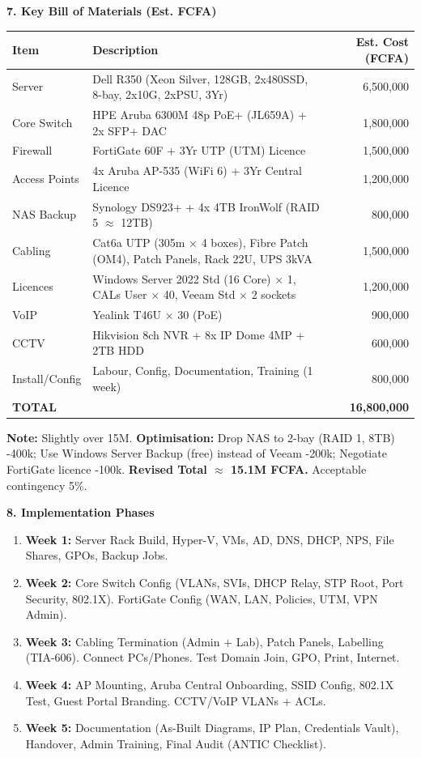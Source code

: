 \documentclass[11pt]{article}
\begin{document}
\begin{exoresolu}
\noindent\textbf{7. Key Bill of Materials (Est. FCFA)}
\begin{center}
\begin{tabularx}{\linewidth}{|l|X|r|}
\hline
\rowcolor{popblueL}
\textbf{Item} & \textbf{Description} & \textbf{Est. Cost (FCFA)} \\
\hline
Server & Dell R350 (Xeon Silver, 128GB, 2x480SSD, 8-bay, 2x10G, 2xPSU, 3Yr) & 6,500,000 \\
Core Switch & HPE Aruba 6300M 48p PoE+ (JL659A) + 2x SFP+ DAC & 1,800,000 \\
Firewall & FortiGate 60F + 3Yr UTP (UTM) Licence & 1,500,000 \\
Access Points & 4x Aruba AP-535 (WiFi 6) + 3Yr Central Licence & 1,200,000 \\
NAS Backup & Synology DS923+ + 4x 4TB IronWolf (RAID 5 $\approx$ 12TB) & 800,000 \\
Cabling & Cat6a UTP (305m $\times$ 4 boxes), Fibre Patch (OM4), Patch Panels, Rack 22U, UPS 3kVA & 1,500,000 \\
Licences & Windows Server 2022 Std (16 Core) $\times$ 1, CALs User $\times$ 40, Veeam Std $\times$ 2 sockets & 1,200,000 \\
VoIP & Yealink T46U $\times$ 30 (PoE) & 900,000 \\
CCTV & Hikvision 8ch NVR + 8x IP Dome 4MP + 2TB HDD & 600,000 \\
Install/Config & Labour, Config, Documentation, Training (1 week) & 800,000 \\
\hline
\textbf{TOTAL} & & \textbf{16,800,000} \\
\hline
\end{tabularx}
\end{center}
\textbf{Note:} Slightly over 15M. \textbf{Optimisation:} Drop NAS to 2-bay (RAID 1, 8TB) -400k; Use Windows Server Backup (free) instead of Veeam -200k; Negotiate FortiGate licence -100k. \textbf{Revised Total $\approx$ 15.1M FCFA.} Acceptable contingency 5\%.

\noindent\textbf{8. Implementation Phases}
\begin{enumerate}
    \item \textbf{Week 1:} Server Rack Build, Hyper-V, VMs, AD, DNS, DHCP, NPS, File Shares, GPOs, Backup Jobs.
    \item \textbf{Week 2:} Core Switch Config (VLANs, SVIs, DHCP Relay, STP Root, Port Security, 802.1X). FortiGate Config (WAN, LAN, Policies, UTM, VPN Admin).
    \item \textbf{Week 3:} Cabling Termination (Admin + Lab), Patch Panels, Labelling (TIA-606). Connect PCs/Phones. Test Domain Join, GPO, Print, Internet.
    \item \textbf{Week 4:} AP Mounting, Aruba Central Onboarding, SSID Config, 802.1X Test, Guest Portal Branding. CCTV/VoIP VLANs + ACLs.
    \item \textbf{Week 5:} Documentation (As-Built Diagrams, IP Plan, Credentials Vault), Handover, Admin Training, Final Audit (ANTIC Checklist).
\end{enumerate}
\end{exoresolu}
\end{document}
